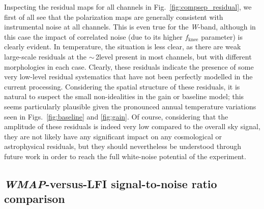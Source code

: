 \documentclass[twocolumn]{../../common/aa}
\def\WMAP{\emph{WMAP}}
\newcommand{\W}[0]{\textit W}
\begin{document}
Inspecting the residual maps for all channels in Fig.~\ref{fig:compsep_residual}, we first of all see that the polarization maps are generally consistent with instrumental noise at all channels. This is even true for the \W-band, although in this case the impact of correlated noise (due to its higher $f_{\mathrm{knee}}$ parameter) is clearly evident. In temperature, the situation is less clear, as there are weak large-scale residuals at the $\sim$\,2\muK level present in most channels, but with different morphologies in each case. Clearly, these residuals indicate the presence of some very low-level residual systematics that have not been perfectly modelled in the current processing. Considering the spatial structure of these residuals, it is natural to suspect the small non-idealities in the gain or baseline model; this seems particularly plausible given the pronounced annual temperature variations seen in Figs.~\ref{fig:baseline} and \ref{fig:gain}. Of course, considering that the amplitude of these residuals is indeed very low compared to the overall sky signal, they are not likely have any significant impact on any cosmological or astrophysical residuals, but they should nevertheless be understood through future work in order to reach the full white-noise potential of the experiment.


\subsection{\WMAP-versus-LFI signal-to-noise ratio comparison}
\label{sec:s2n}
\end{document}
